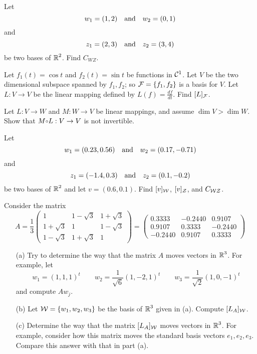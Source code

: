 \documentclass{ximera}
\begin{document}
\EXER

\TEXER

\begin{exercise} \label{c7.1.2}
Let
\[
w_1 = (1,2) \quad\mbox{and}\quad w_2 = (0,1)
\]
and
\[
z_1 = (2,3) \quad\mbox{and}\quad z_2 = (3,4)
\]
be two bases of $\mbox{$\Bbb{R}$}^2$.  Find $C_{WZ}$.
\end{exercise}



\begin{exercise} \label{c7.3.2}
Let $f_1(t)=\cos t$ and $f_2(t)=\sin t$ be functions in ${\cal C}^1$.
Let $V$ be the two dimensional subspace spanned by $f_1,f_2$; so
${\cal F}=\{f_1,f_2\}$ is a basis for $V$.  Let $L:V\to V$ be the
linear mapping defined by $L(f)=\frac{df}{dt}$.  Find $[L]_{\cal F}$.
\end{exercise}

\begin{exercise} \label{c7.3.3}
Let $L:V\to W$ and $M:W\to V$ be linear mappings, and assume $\dim V > \dim W$.
Show that $M\compose L:V\to V$ is not invertible.
\end{exercise}

\CEXER

\begin{exercise} \label{c7.1.5}
Let
\[
w_1 = (0.23,0.56) \quad\mbox{and}\quad w_2 = (0.17,-0.71)
\]
and
\[
z_1 = (-1.4,0.3) \quad\mbox{and}\quad z_2 = (0.1,-0.2)
\]
be two bases of $\mbox{$\Bbb{R}$}^2$ and let $v=(0.6,0.1)$.  Find $[v]_{\cal
W}$, $[v]_{\cal Z}$, and $C_{\cal WZ}$.
\end{exercise}

\begin{exercise}  \label{c7.5.A}
Consider the matrix
\begin{equation*}
A = \frac{1}{3}\left(\begin{array}{ccc}
	1 & 1-\sqrt{3} & 1+\sqrt{3} \\
	1+\sqrt{3} & 1 & 1-\sqrt{3} \\
	1-\sqrt{3} & 1+\sqrt{3} & 1
	\end{array}\right)
  =  \left(\begin{array}{rrr}
    0.3333  & -0.2440  &  0.9107\\
    0.9107  &  0.3333  & -0.2440\\
   -0.2440  &  0.9107  &  0.3333
 \end{array}\right)
\end{equation*}
\begin{itemize}
\item[(a)]  Try to determine the way that the matrix $A$ moves vectors
in $\mbox{$\Bbb{R}$}^3$.  For example, let
\[
w_1=(1,1,1)^t \qquad w_2 = \frac{1}{\sqrt{6}}(1,-2,1)^t \qquad w_3 =
\frac{1}{\sqrt{2}}(1,0,-1)^t
\]
and compute $Aw_j$.
\item[(b)]  Let ${\cal W} = \{w_1,w_2,w_3\}$ be the basis of $\mbox{$\Bbb{R}$}^3$ given
in (a).  Compute $[L_A]_{\cal W}$.
\item[(c)]  Determine the way that the matrix $[L_A]_{\cal W}$ moves 
vectors in $\mbox{$\Bbb{R}$}^3$.  For example, consider how this matrix moves the standard 
basis vectors $e_1,e_2,e_3$.  Compare this answer with that in part (a).
\end{itemize}
\end{exercise}
\end{document}
